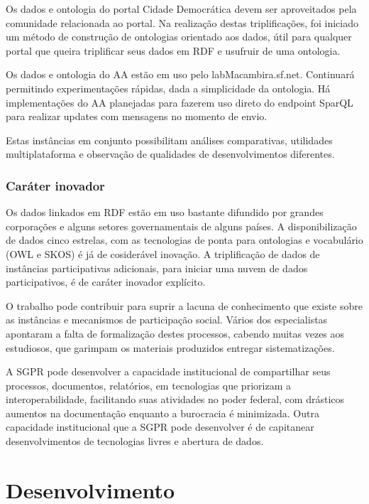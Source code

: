 \documentclass[12pt]{article}
\begin{document}
Os dados e ontologia do portal Cidade Democrática devem ser aproveitados pela comunidade relacionada ao portal. Na realização destas triplificações, foi iniciado um método de construção de ontologias orientado aos dados, útil para qualquer portal que queira triplificar seus dados em RDF e usufruir de uma ontologia.

Os dados e ontologia do AA estão em uso pelo labMacambira.sf.net. Continuará permitindo experimentações rápidas, dada a simplicidade da ontologia. Há implementações do AA planejadas para fazerem uso direto do endpoint SparQL para realizar updates com mensagens no momento de envio.

Estas instâncias em conjunto possibilitam análises comparativas, utilidades multiplataforma e observação de qualidades de desenvolvimentos diferentes.

\subsubsection{Caráter inovador}
Os dados linkados em RDF estão em uso bastante difundido por grandes corporações e alguns setores governamentais de alguns países. A disponibilização de dados cinco estrelas, com as tecnologias de ponta para ontologias e vocabulário (OWL e SKOS) é já de cosiderável inovação. A triplificação de dados de instâncias participativas adicionais, para iniciar uma nuvem de dados participativos, é de caráter inovador explícito.

O trabalho pode contribuir para suprir a lacuna de conhecimento que existe sobre as instâncias e mecanismos de participação social. Vários dos especialistas apontaram a falta de formalização destes processos, cabendo muitas vezes aos estudiosos, que garimpam os materiais produzidos entregar sistematizações.

A SGPR pode desenvolver a capacidade institucional de compartilhar seus processos, documentos, relatórios, em tecnologias que priorizam a interoperabilidade, facilitando suas atividades no poder federal, com drásticos aumentos na documentação enquanto a burocracia é minimizada.
Outra capacidade institucional que a SGPR pode desenvolver é de capitanear desenvolvimentos de tecnologias livres e abertura de dados.

\section{Desenvolvimento}\label{sec:dev}
\end{document}
